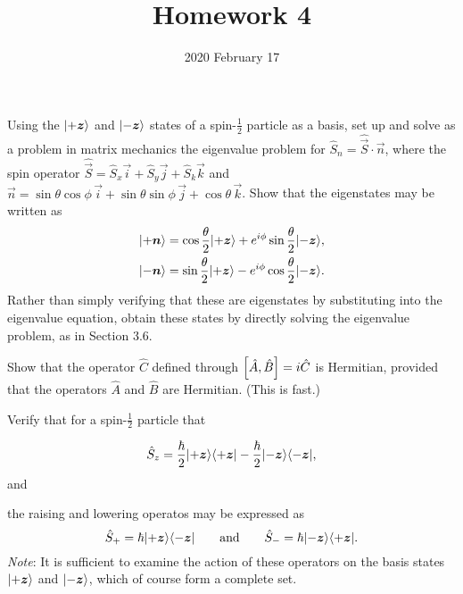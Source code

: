 \documentclass{../phys116}
\title{Homework 4}
\author{}
\date{2020 February 17}
\begin{document}
\begin{exercise}
  Using the \(\ket{+\vec z}\) and \(\ket{-\vec z}\) states of a
  spin-\(\frac 1 2\) particle as a basis, set up and solve as a
  problem in matrix mechanics the eigenvalue problem for
  \(\hat S_n = \hat{\vec S} \cdot \vec n\), where the spin operator
  \(\hat{\vec S} = \hat S_x \vec i + \hat S_y \vec j + \hat S_k \vec
  k\) and
  \(\vec n = \sin \theta \cos \phi \, \vec i + \sin \theta \sin \phi
  \, \vec j + \cos \theta \, \vec k\).  Show that the eigenstates may
  be written as
  \begin{align*}
    \ket{+\vec n}
    &= \cos \frac \theta 2 \ket{+\vec z}
      + e^{i\phi} \sin \frac \theta 2 \ket{-\vec z}, \\
    \ket{-\vec n}
    &= \sin \frac \theta 2 \ket{+\vec z}
      - e^{i\phi} \cos \frac \theta 2 \ket{-\vec z}.
  \end{align*}
  Rather than simply verifying that these are eigenstates by
  substituting into the eigenvalue equation, obtain these states by
  directly solving the eigenvalue problem, as in Section 3.6.
\end{exercise}

\begin{solution}

\end{solution}

\begin{exercise}
  Show that the operator \(\hat C\) defined through
  \(\sbr*{\hat A, \hat B} = i \hat C\) is Hermitian, provided that the
  operators \(\hat A\) and \(\hat B\) are Hermitian.  (This is fast.)

  Verify that for a spin-\(\frac 1 2\) particle that
  \begin{problems}
  \item
    \[
      \hat S_z
      = \frac \hbar 2 \ket{+\vec z} \bra{+\vec z}
      - \frac \hbar 2 \ket{-\vec z} \bra{-\vec z},
    \]
    and
  \item the raising and lowering operatos may be expressed as
    \[
      \hat S_+ = \hbar \ket{+\vec z} \bra{-\vec z} \qquad \text{and} \qquad
      \hat S_- = \hbar \ket{-\vec z} \bra{+\vec z}.
    \]
    \textit{Note}: It is sufficient to examine the action of these
    operators on the basis states \(\ket{+\vec z}\) and
    \(\ket{-\vec z}\), which of course form a complete set.
  \end{problems}
\end{exercise}
\end{document}
